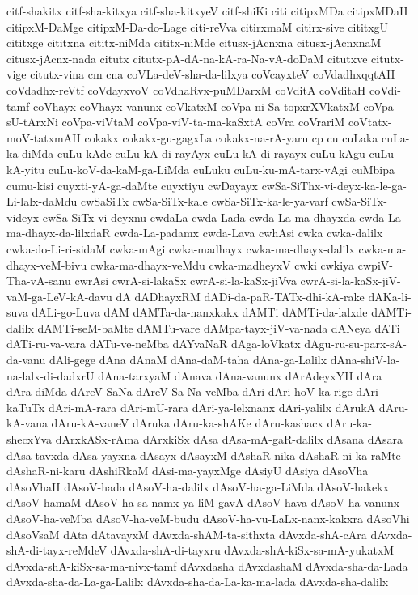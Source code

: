 {citf-shakitx
citf-sha-kitxya
citf-sha-kitxyeV
citf-shiKi
citi
citipxMDa
citipxMDaH
citipxM-DaMge
citipxM-Da-do-Lage
citi-reVva
citirxmaM
citirx-sive
cititxgU
cititxge
cititxna
cititx-niMda
cititx-niMde
citusx-jAcnxna
citusx-jAcnxnaM
citusx-jAcnx-nada
citutx
citutx-pA-dA-na-kA-ra-Na-vA-doDaM
citutxve
citutx-vige
citutx-vina
cm
cna
coVLa-deV-sha-da-lilxya
coVcayxteV
coVdadhxqqtAH
coVdadhx-reVtf
coVdayxvoV
coVdhaRvx-puMDarxM
coVditA
coVditaH
coVdi-tamf
coVhayx
coVhayx-vanunx
coVkatxM
coVpa-ni-Sa-topxrXVkatxM
coVpa-sU-tArxNi
coVpa-viVtaM
coVpa-viV-ta-ma-kaSxtA
coVra
coVrariM
coVtatx-moV-tatxmAH
cokakx
cokakx-gu-gagxLa
cokakx-na-rA-yaru
cp
cu
cuLaka
cuLa-ka-diMda
cuLu-kAde
cuLu-kA-di-rayAyx
cuLu-kA-di-rayayx
cuLu-kAgu
cuLu-kA-yitu
cuLu-koV-da-kaM-ga-LiMda
cuLuku
cuLu-ku-mA-tarx-vAgi
cuMbipa
cumu-kisi
cuyxti-yA-ga-daMte
cuyxtiyu
cwDayayx
cwSa-SiThx-vi-deyx-ka-le-ga-Li-lalx-daMdu
cwSaSiTx
cwSa-SiTx-kale
cwSa-SiTx-ka-le-ya-varf
cwSa-SiTx-videyx
cwSa-SiTx-vi-deyxnu
cwdaLa
cwda-Lada
cwda-La-ma-dhayxda
cwda-La-ma-dhayx-da-lilxdaR
cwda-La-padamx
cwda-Lava
cwhAsi
cwka
cwka-dalilx
cwka-do-Li-ri-sidaM
cwka-mAgi
cwka-madhayx
cwka-ma-dhayx-dalilx
cwka-ma-dhayx-veM-bivu
cwka-ma-dhayx-veMdu
cwka-madheyxV
cwki
cwkiya
cwpiV-Tha-vA-sanu
cwrAsi
cwrA-si-lakaSx
cwrA-si-la-kaSx-jiVva
cwrA-si-la-kaSx-jiV-vaM-ga-LeV-kA-davu
dA
dADhayxRM
dADi-da-paR-TATx-dhi-kA-rake
dAKa-li-suva
dALi-go-Luva
dAM
dAMTa-da-nanxkakx
dAMTi
dAMTi-da-lalxde
dAMTi-dalilx
dAMTi-seM-baMte
dAMTu-vare
dAMpa-tayx-jiV-va-nada
dANeya
dATi
dATi-ru-va-vara
dATu-ve-neMba
dAYvaNaR
dAga-loVkatx
dAgu-ru-su-parx-sA-da-vanu
dAli-gege
dAna
dAnaM
dAna-daM-taha
dAna-ga-Lalilx
dAna-shiV-la-na-lalx-di-dadxrU
dAna-tarxyaM
dAnava
dAna-vanunx
dArAdeyxYH
dAra
dAra-diMda
dAreV-SaNa
dAreV-Sa-Na-veMba
dAri
dAri-hoV-ka-rige
dAri-kaTuTx
dAri-mA-rara
dAri-mU-rara
dAri-ya-lelxnanx
dAri-yalilx
dArukA
dAru-kA-vana
dAru-kA-vaneV
dAruka
dAru-ka-shAKe
dAru-kashacx
dAru-ka-shecxYva
dArxkASx-rAma
dArxkiSx
dAsa
dAsa-mA-gaR-dalilx
dAsana
dAsara
dAsa-tavxda
dAsa-yayxna
dAsayx
dAsayxM
dAshaR-nika
dAshaR-ni-ka-raMte
dAshaR-ni-karu
dAshiRkaM
dAsi-ma-yayxMge
dAsiyU
dAsiya
dAsoVha
dAsoVhaH
dAsoV-hada
dAsoV-ha-dalilx
dAsoV-ha-ga-LiMda
dAsoV-hakekx
dAsoV-hamaM
dAsoV-ha-sa-namx-ya-liM-gavA
dAsoV-hava
dAsoV-ha-vanunx
dAsoV-ha-veMba
dAsoV-ha-veM-budu
dAsoV-ha-vu-LaLx-nanx-kakxra
dAsoVhi
dAsoVsaM
dAta
dAtavayxM
dAvxda-shAM-ta-sithxta
dAvxda-shA-cAra
dAvxda-shA-di-tayx-reMdeV
dAvxda-shA-di-tayxru
dAvxda-shA-kiSx-sa-mA-yukatxM
dAvxda-shA-kiSx-sa-ma-nivx-tamf
dAvxdasha
dAvxdashaM
dAvxda-sha-da-Lada
dAvxda-sha-da-La-ga-Lalilx
dAvxda-sha-da-La-ka-ma-lada
dAvxda-sha-dalilx
}
